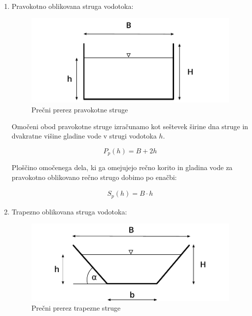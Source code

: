 \newpage
\begin{enumerate}
	\item Pravokotno oblikovana struga vodotoka:
	
	\begin{figure}[H]
		\begin{centering}
			\includegraphics{slike/konsumpcijska_krivulja/rectangularChannel.pdf}		
			\caption{Prečni prerez pravokotne struge}\label{fig:pravokotna struga}
		\end{centering}
	\end{figure}
	

	Omočeni obod pravokotne struge izračunamo kot seštevek širine dna struge in dvakratne višine gladine vode v strugi vodotoka $h$.
	
	\begin{ceqn}
	\begin{equation}
	P_{p}(h) = B + 2h
	\end{equation}
	\end{ceqn}
	
	Ploščino omočenega dela, ki ga omejujejo rečno korito in gladina vode za pravokotno oblikovano rečno strugo dobimo po enačbi:
	
	\begin{ceqn}
	\begin{align}
	S_{p}(h) = B \cdot h
	\end{align}
	\end{ceqn}
	
	\item Trapezno oblikovana struga vodotoka:
	
		\begin{figure}[ht!]
			\begin{centering}
				\includegraphics{slike/konsumpcijska_krivulja/trapezoidChannel.pdf}		
				\caption{Prečni prerez trapezne struge}\label{fig:trapezna struga}
			\end{centering}
		\end{figure}
	

\end{enumerate}
